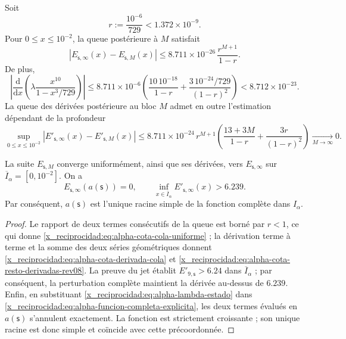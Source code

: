Soit
\[
 r:=\frac{10^{-6}}{729}<1.372\mathbin{\times}10^{-9}.
\]
Pour \(0\leq x\leq10^{-2}\), la queue postérieure à \(M\) satisfait
\begin{equation}
 \left|E_{\mathsf s,\infty}(x)-E_{\mathsf s,M}(x)\right|
 \leq
 8.711\mathbin{\times}10^{-26}\,\frac{r^{M+1}}{1-r}.
 \label{x_reciprocidad:eq:alpha-cota-cola-uniforme}
\end{equation}
De plus,
\begin{equation}
 \left|\frac{\mathrm d}{\mathrm dx}
  \left(\lambda\frac{x^{10}}{1-x^3/729}\right)\right|
 \leq 8.711\mathbin{\times}10^{-6}
 \left(\frac{10\,10^{-18}}{1-r}
 +\frac{3\,10^{-24}/729}{(1-r)^2}\right)
 <8.712\mathbin{\times}10^{-23}.
 \label{x_reciprocidad:eq:alpha-cota-derivada-cola}
\end{equation}
La queue des dérivées postérieure au bloc \(M\) admet en outre l'estimation dépendant de la profondeur
\begin{equation}
 \sup_{0\le x\le10^{-2}}
 \left|E'_{\mathsf s,\infty}(x)-E'_{\mathsf s,M}(x)\right|
 \le 8.711\mathbin{\times}10^{-24}\,r^{M+1}
 \left(\frac{13+3M}{1-r}+\frac{3r}{(1-r)^2}\right)
 \xrightarrow[M\to\infty]{}0.
 \label{x_reciprocidad:eq:alpha-cota-resto-derivadas-rev08}
\end{equation}

\begin{theorem}
\label{x_reciprocidad:thm:alpha-raiz-completa-explicita}
La suite \(E_{\mathsf s,M}\) converge uniformément, ainsi que ses
dérivées, vers \(E_{\mathsf s,\infty}\) sur
\(\overline I_\alpha=[0,10^{-2}]\). On a
\begin{equation}
 E_{\mathsf s,\infty}(a(\mathsf s))=0,
 \qquad
 \inf_{x\in\overline I_\alpha}
 E'_{\mathsf s,\infty}(x)>6.239.
 \label{x_reciprocidad:eq:alpha-raiz-y-derivada-completas}
\end{equation}
Par conséquent, \(a(\mathsf s)\) est l'unique racine simple de la fonction complète dans \(I_\alpha\).
\end{theorem}

\begin{proof}
Le rapport de deux termes consécutifs de la queue est borné par \(r<1\),
ce qui donne \eqref{x_reciprocidad:eq:alpha-cota-cola-uniforme} ; la dérivation terme à
terme et la somme des deux séries géométriques donnent
\eqref{x_reciprocidad:eq:alpha-cota-derivada-cola} et
\eqref{x_reciprocidad:eq:alpha-cota-resto-derivadas-rev08}. La preuve du jet établit
\(E'_{9,\mathsf s}>6.24\) dans \(\overline I_\alpha\) ; par conséquent, la
perturbation complète maintient la dérivée au-dessus de \(6.239\).
Enfin, en substituant \eqref{x_reciprocidad:eq:alpha-lambda-estado} dans
\eqref{x_reciprocidad:eq:alpha-funcion-completa-explicita}, les deux termes évalués en
\(a(\mathsf s)\) s'annulent exactement. La fonction est strictement
croissante ; son unique racine est donc simple et coïncide avec cette précoordonnée.
\end{proof}

